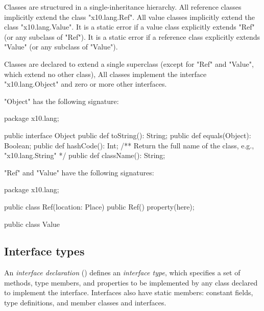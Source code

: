         Classes
        are structured in a
        single-inheritance hierarchy.  All reference classes
        implicitly extend the class \xcd"x10.lang.Ref".
        All value classes implicitly extend the class \xcd"x10.lang.Value".
        It is a static error if a value class explicitly extends
        \xcd"Ref" (or any subclass of \xcd"Ref").
        It is a static error if a reference class explicitly extends
        \xcd"Value" (or any subclass of \xcd"Value").

        Classes are declared to extend a single
        superclass (except for \xcd"Ref" and \xcd"Value", which extend
        no other class),
        All classes implement the
        interface \xcd"x10.lang.Object"
        and zero or more other interfaces.

\xcd"Object" has the following signature:

\begin{xten}
package x10.lang;

public interface Object {
    public def toString(): String;
    public def equals(Object): Boolean;
    public def hashCode(): Int;
    /** Return the full name of the class, e.g., "x10.lang.String" */
    public def className(): String;
}
\end{xten}


\xcd"Ref" and \xcd"Value" have the following signatures:

\begin{xten}
package x10.lang;

public class Ref(location: Place) {
    public Ref() { property(here); }
}

public class Value { }
\end{xten}



\subsection{Interface types}
\label{InterfaceTypes}


        An {\em interface declaration} ()
        defines an {\em interface type}, which specifies a set of
        methods, type members, and properties to be implemented by any class
        declared to implement the interface.  Interfaces also
        have static members: constant fields, type definitions,
        and member classes and interfaces.

